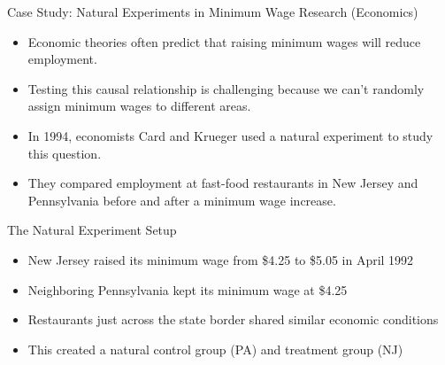 \documentclass{beamer}
\begin{document}
\begin{frame}{Case Study: Natural Experiments in Minimum Wage Research (Economics)}
    \begin{itemize}
        \item Economic theories often predict that raising minimum wages will reduce employment.
        \item Testing this causal relationship is challenging because we can't randomly assign minimum wages to different areas.
        \item In 1994, economists Card and Krueger used a natural experiment to study this question.
        \item They compared employment at fast-food restaurants in New Jersey and Pennsylvania before and after a minimum wage increase.
    \end{itemize}
    
    \begin{block}{The Natural Experiment Setup}
        \begin{itemize}
            \item New Jersey raised its minimum wage from \$4.25 to \$5.05 in April 1992
            \item Neighboring Pennsylvania kept its minimum wage at \$4.25
            \item Restaurants just across the state border shared similar economic conditions
            \item This created a natural control group (PA) and treatment group (NJ)
        \end{itemize}
    \end{block}
\end{frame}
\end{document}
